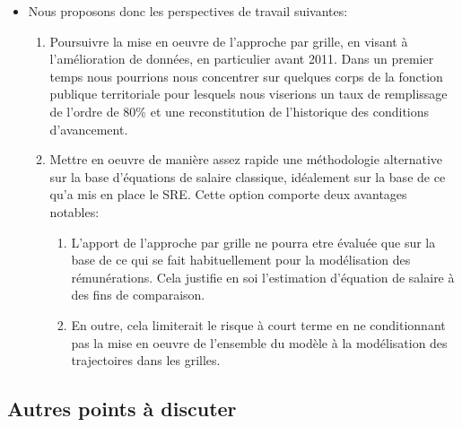 \documentclass[11pt,a4paper]{article}
\begin{document}
\begin{itemize}
\item Nous proposons donc les perspectives de travail suivantes:
\begin{enumerate}
\item Poursuivre la mise en oeuvre de l'approche par grille, en visant à l'amélioration de données, en particulier avant 2011. Dans un premier temps nous pourrions nous concentrer sur quelques corps de la fonction publique territoriale pour lesquels nous viserions un taux de remplissage de l'ordre de 80\% et une reconstitution de l'historique des conditions d'avancement. 
\item Mettre en oeuvre de manière assez rapide une méthodologie alternative sur la base d'équations de salaire classique, idéalement sur la base de ce qu'a mis en place le SRE. Cette option comporte deux avantages notables:
\begin{enumerate}
\item L'apport de l'approche par grille ne pourra etre évaluée que sur la base de ce qui se fait habituellement pour la modélisation des rémunérations. Cela justifie en soi l'estimation d'équation de salaire à des fins de comparaison. 
\item En outre, cela limiterait le risque à court terme en ne conditionnant pas la mise en oeuvre de l'ensemble du modèle à la modélisation des trajectoires dans les grilles. 
\end{enumerate} 
\end{enumerate}

\end{itemize}


\subsection*{Autres points à discuter}
\end{document}

